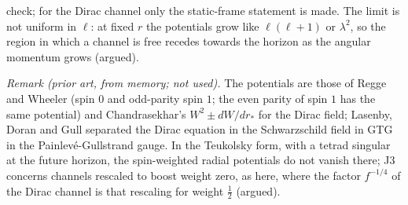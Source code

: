 check; for the Dirac channel only the static-frame statement is made. The limit is not uniform in $\ell$: at fixed $r$ the potentials grow like $\ell(\ell+1)$ or $\lambda^{2}$, so the region in which a channel is free recedes towards the horizon as the angular momentum grows (argued).

\emph{Remark (prior art, from memory; not used).} The potentials are those of Regge and Wheeler (spin $0$ and odd-parity spin $1$; the even parity of spin $1$ has the same potential) and Chandrasekhar's $W^{2} \pm dW/dr_{*}$ for the Dirac field; Lasenby, Doran and Gull separated the Dirac equation in the Schwarzschild field in GTG in the Painlev\'e-Gullstrand gauge. In the Teukolsky form, with a tetrad singular at the future horizon, the spin-weighted radial potentials do not vanish there; J3 concerns channels rescaled to boost weight zero, as here, where the factor $f^{-1/4}$ of the Dirac channel is that rescaling for weight $\tfrac12$ (argued).
